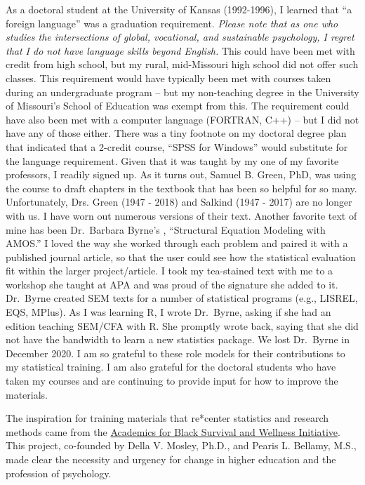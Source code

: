 \documentclass[
  11pt,
]{book}
\begin{document}
As a doctoral student at the University of Kansas (1992-1996), I learned that ``a foreign language'' was a graduation requirement. \emph{Please note that as one who studies the intersections of global, vocational, and sustainable psychology, I regret that I do not have language skills beyond English.} This could have been met with credit from high school, but my rural, mid-Missouri high school did not offer such classes. This requirement would have typically been met with courses taken during an undergraduate program -- but my non-teaching degree in the University of Missouri's School of Education was exempt from this. The requirement could have also been met with a computer language (FORTRAN, C++) -- but I did not have any of those either. There was a tiny footnote on my doctoral degree plan that indicated that a 2-credit course, ``SPSS for Windows'' would substitute for the language requirement. Given that it was taught by my one of my favorite professors, I readily signed up. As it turns out, Samuel B. Green, PhD, was using the course to draft chapters in the textbook \citep{green_using_2017} that has been so helpful for so many. Unfortunately, Drs. Green (1947 - 2018) and Salkind (1947 - 2017) are no longer with us. I have worn out numerous versions of their text. Another favorite text of mine has been Dr.~Barbara Byrne's \citeyearpar{byrne_structural_2016}, ``Structural Equation Modeling with AMOS.'' I loved the way she worked through each problem and paired it with a published journal article, so that the user could see how the statistical evaluation fit within the larger project/article. I took my tea-stained text with me to a workshop she taught at APA and was proud of the signature she added to it. Dr.~Byrne created SEM texts for a number of statistical programs (e.g., LISREL, EQS, MPlus). As I was learning R, I wrote Dr.~Byrne, asking if she had an edition teaching SEM/CFA with R. She promptly wrote back, saying that she did not have the bandwidth to learn a new statistics package. We lost Dr.~Byrne in December 2020. I am so grateful to these role models for their contributions to my statistical training. I am also grateful for the doctoral students who have taken my courses and are continuing to provide input for how to improve the materials.

The inspiration for training materials that re*center statistics and research methods came from the \href{https://www.academics4blacklives.com/}{Academics for Black Survival and Wellness Initiative}. This project, co-founded by Della V. Mosley, Ph.D., and Pearis L. Bellamy, M.S., made clear the necessity and urgency for change in higher education and the profession of psychology.
\end{document}

